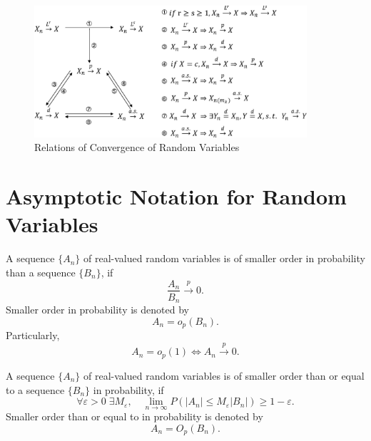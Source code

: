 \begin{figure}[htp]
    \centering
    \includegraphics[width=0.9\textwidth]{./probability-theory/figures/relation-of-convergences.eps}
    \caption{Relations of Convergence of Random Variables}
\end{figure}

\section{Asymptotic Notation for Random Variables}

\begin{definition}[Little $o_p$]
    A sequence $\{A_n\}$ of real-valued random variables is of smaller order in probability than a sequence $\{B_n\}$, if
    \begin{equation}
        \frac{A_n}{B_n}\stackrel{p}{\rightarrow}0.
    \end{equation}
    Smaller order in probability is denoted by
    \begin{equation}
        A_n=o_p(B_n).
    \end{equation}
    Particularly,
    \begin{equation}
        A_n=o_p(1)\iff A_n\stackrel{p}{\rightarrow}0.
    \end{equation}
\end{definition}

\begin{definition}[Big $O_p$]
    A sequence $\{A_n\}$ of real-valued random variables is of smaller order than or equal to a sequence $\{B_n\}$ in probability, if
    \begin{equation}
        \forall\varepsilon>0\;\exists M_\varepsilon,\quad\lim_{n\rightarrow\infty} P\left(|A_n|\leq M_\varepsilon|B_n|\right)\geq 1-\varepsilon.
    \end{equation}
    Smaller order than or equal to in probability is denoted by
    \begin{equation}
        A_n=O_p(B_n).
    \end{equation}
\end{definition}

\begin{note}

\end{note}
